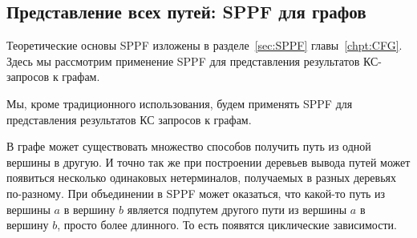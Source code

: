\subsection{Представление всех путей: SPPF для графов}

Теоретические основы SPPF изложены в разделе~\ref{sec:SPPF} главы~\ref{chpt:CFG}.
Здесь мы рассмотрим применение SPPF для представления результатов КС-запросов к графам.

Мы, кроме традиционного использования, будем применять SPPF для представления результатов КС запросов к графам.

В графе может существовать множество способов получить путь из одной вершины в другую. И точно так же при построении деревьев вывода путей может появиться несколько одинаковых нетерминалов, получаемых в разных деревьях по-разному. При объединении в SPPF может оказаться, что какой-то путь из вершины $a$ в вершину $b$ является подпутем другого пути из вершины $a$ в вершину $b$, просто более длинного. То есть появятся циклические зависимости.

